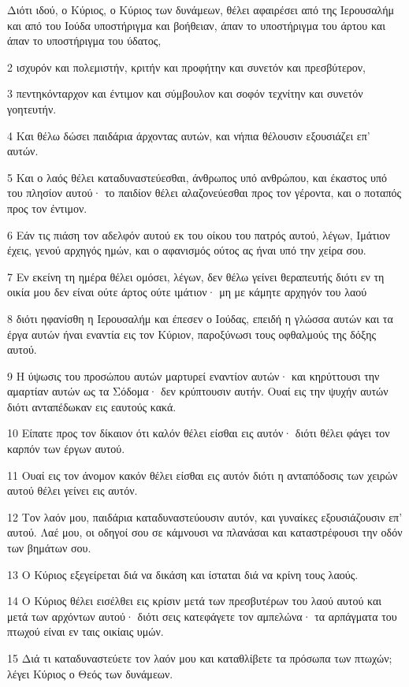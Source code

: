 \par Διότι ιδού, ο Κύριος, ο Κύριος των δυνάμεων, θέλει αφαιρέσει από της Ιερουσαλήμ και από του Ιούδα υποστήριγμα και βοήθειαν, άπαν το υποστήριγμα του άρτου και άπαν το υποστήριγμα του ύδατος,
\par 2 ισχυρόν και πολεμιστήν, κριτήν και προφήτην και συνετόν και πρεσβύτερον,
\par 3 πεντηκόνταρχον και έντιμον και σύμβουλον και σοφόν τεχνίτην και συνετόν γοητευτήν.
\par 4 Και θέλω δώσει παιδάρια άρχοντας αυτών, και νήπια θέλουσιν εξουσιάζει επ' αυτών.
\par 5 Και ο λαός θέλει καταδυναστεύεσθαι, άνθρωπος υπό ανθρώπου, και έκαστος υπό του πλησίον αυτού· το παιδίον θέλει αλαζονεύεσθαι προς τον γέροντα, και ο ποταπός προς τον έντιμον.
\par 6 Εάν τις πιάση τον αδελφόν αυτού εκ του οίκου του πατρός αυτού, λέγων, Ιμάτιον έχεις, γενού αρχηγός ημών, και ο αφανισμός ούτος ας ήναι υπό την χείρα σου.
\par 7 Εν εκείνη τη ημέρα θέλει ομόσει, λέγων, δεν θέλω γείνει θεραπευτής διότι εν τη οικία μου δεν είναι ούτε άρτος ούτε ιμάτιον· μη με κάμητε αρχηγόν του λαού
\par 8 διότι ηφανίσθη η Ιερουσαλήμ και έπεσεν ο Ιούδας, επειδή η γλώσσα αυτών και τα έργα αυτών ήναι εναντία εις τον Κύριον, παροξύνωσι τους οφθαλμούς της δόξης αυτού.
\par 9 Η ύψωσις του προσώπου αυτών μαρτυρεί εναντίον αυτών· και κηρύττουσι την αμαρτίαν αυτών ως τα Σόδομα· δεν κρύπτουσιν αυτήν. Ουαί εις την ψυχήν αυτών διότι ανταπέδωκαν εις εαυτούς κακά.
\par 10 Είπατε προς τον δίκαιον ότι καλόν θέλει είσθαι εις αυτόν· διότι θέλει φάγει τον καρπόν των έργων αυτού.
\par 11 Ουαί εις τον άνομον κακόν θέλει είσθαι εις αυτόν διότι η ανταπόδοσις των χειρών αυτού θέλει γείνει εις αυτόν.
\par 12 Τον λαόν μου, παιδάρια καταδυναστεύουσιν αυτόν, και γυναίκες εξουσιάζουσιν επ' αυτού. Λαέ μου, οι οδηγοί σου σε κάμνουσι να πλανάσαι και καταστρέφουσι την οδόν των βημάτων σου.
\par 13 Ο Κύριος εξεγείρεται διά να δικάση και ίσταται διά να κρίνη τους λαούς.
\par 14 Ο Κύριος θέλει εισέλθει εις κρίσιν μετά των πρεσβυτέρων του λαού αυτού και μετά των αρχόντων αυτού· διότι σεις κατεφάγετε τον αμπελώνα· τα αρπάγματα του πτωχού είναι εν ταις οικίαις υμών.
\par 15 Διά τι καταδυναστεύετε τον λαόν μου και καταθλίβετε τα πρόσωπα των πτωχών; λέγει Κύριος ο Θεός των δυνάμεων.
